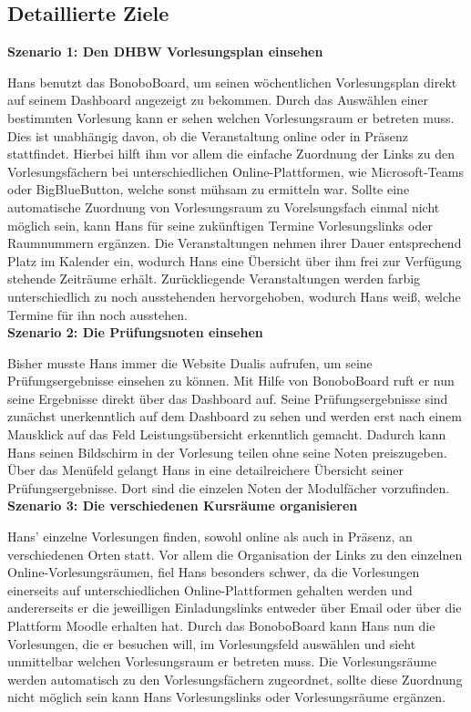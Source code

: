 \documentclass[a4paper,11pt]{scrartcl}
\begin{document}
	\subsection{Detaillierte Ziele} %

\textbf{Szenario 1: Den DHBW Vorlesungsplan einsehen}\par\noindent
Hans benutzt das BonoboBoard, um seinen wöchentlichen Vorlesungsplan direkt auf seinem Dashboard angezeigt zu bekommen. Durch das Auswählen einer bestimmten Vorlesung kann er sehen welchen Vorlesungsraum er betreten muss. Dies ist unabhängig davon, ob die Veranstaltung online oder in Präsenz stattfindet. Hierbei hilft ihm vor allem die einfache Zuordnung der Links zu den Vorlesungsfächern bei unterschiedlichen Online-Plattformen, wie Microsoft-Teams oder BigBlueButton, welche sonst mühsam zu ermitteln war. Sollte eine automatische Zuordnung von Vorlesungsraum zu Vorelsungsfach einmal nicht möglich sein, kann Hans für seine zukünftigen Termine Vorlesungslinks oder Raumnummern ergänzen. Die Veranstaltungen nehmen ihrer Dauer entsprechend Platz im Kalender ein, wodurch Hans eine Übersicht über ihm frei zur Verfügung stehende Zeiträume erhält. Zurückliegende Veranstaltungen werden farbig unterschiedlich zu noch ausstehenden hervorgehoben, wodurch Hans weiß, welche Termine für ihn noch ausstehen.\\

\noindent\textbf{Szenario 2: Die Prüfungsnoten einsehen} \par\noindent
Bisher musste Hans immer die Website Dualis aufrufen, um seine Prüfungsergebnisse einsehen zu können. Mit Hilfe von BonoboBoard ruft er nun seine Ergebnisse direkt über das Dashboard auf. Seine Prüfungsergebnisse sind zunächst unerkenntlich auf dem Dashboard zu sehen und werden erst nach einem Mausklick auf das Feld Leistungsübersicht erkenntlich gemacht. Dadurch kann Hans seinen Bildschirm in der Vorlesung teilen ohne seine Noten preiszugeben. Über das Menüfeld gelangt Hans in eine detailreichere Übersicht seiner Prüfungsergebnisse. Dort sind die einzelen Noten der Modulfächer vorzufinden. \\

\noindent\textbf{Szenario 3: Die verschiedenen Kursräume organisieren} \par\noindent
Hans' einzelne Vorlesungen finden, sowohl online als auch in Präsenz, an verschiedenen Orten statt. Vor allem die Organisation der Links zu den einzelnen Online-Vorlesungsräumen, fiel Hans besonders schwer, da die Vorlesungen einerseits auf unterschiedlichen Online-Plattformen gehalten werden und andererseits er die jeweilligen Einladungslinks entweder über Email oder über die Plattform Moodle erhalten hat. Durch das BonoboBoard kann Hans nun die Vorlesungen, die er besuchen will, im Vorlesungsfeld auswählen und sieht unmittelbar welchen Vorlesungsraum er betreten muss. Die Vorlesungsräume werden automatisch zu den Vorlesungsfächern zugeordnet, sollte diese Zuordnung nicht möglich sein kann Hans Vorlesungslinks oder Vorlesungsräume ergänzen. \\
\end{document}

